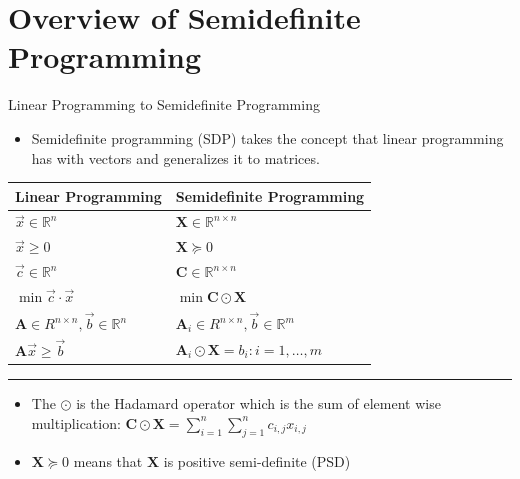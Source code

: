 \documentclass[
	11pt, %
]{beamer}
\begin{document}
\section{Overview of Semidefinite Programming}
\label{sec:orgaf8036d}
\begin{frame}[label={sec:org73100b6}]{Linear Programming to Semidefinite Programming}
\begin{itemize}
\item Semidefinite programming (SDP) takes the concept that linear programming has
with vectors and generalizes it to matrices.
\end{itemize}

\begin{center}
\begin{tabular}{ll}
Linear Programming & Semidefinite Programming\\[0pt]
\hline
\(\vec{x} \in \mathbb{R}^n\) & \(\mathbf{X} \in \mathbb{R}^{n \times n}\)\\[0pt]
\(\vec{x} \geq 0\) & \(\mathbf{X} \succeq 0\)\\[0pt]
\(\vec{c} \in \mathbb{R}^n\) & \(\mathbf{C} \in \mathbb{R}^{n \times n}\)\\[0pt]
\(\min \vec{c} \cdot \vec{x}\) & \(\min \mathbf{C} \odot \mathbf{X}\)\\[0pt]
\(\mathbf{A} \in R^{n \times n}, \vec{b} \in \mathbb{R}^n\) & \(\mathbf{A}_{i} \in R^{n \times n}, \vec{b} \in \mathbb{R}^m\)\\[0pt]
\(\mathbf{A} \vec{x} \geq \vec{b}\) & \(\mathbf{A}_i \odot \mathbf{X} = b_i : i = 1, \ldots, m\)\\[0pt]
\end{tabular}
\end{center}

\pause
\noindent\rule{\textwidth}{0.5pt}
\vspace{-1em}
\begin{itemize}
\item The \(\odot\) is the Hadamard operator which is the sum of element wise multiplication:
\( \mathbf{C} \odot \mathbf{X} = \sum_{i = 1}^n \sum_{j = 1}^n c_{i, j} x_{i, j} \)
\item \( \mathbf{X} \succeq 0 \) means that \( \mathbf{X} \) is positive semi-definite (PSD)
\end{itemize}
\end{frame}
\end{document}
